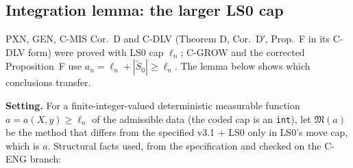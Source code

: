 \subsection{Integration lemma: the larger LS0 cap}\label{sec:cap}
PXN, GEN, C-MIS Cor.~D and C-DLV (Theorem D, Cor.~D′, Prop.~F in its C-DLV form) were proved with LS0 cap $\ell_n$; C-GROW and the corrected Proposition~F use $a_n=\ell_n+|\tilde{S}_0|\ge\ell_n$. The lemma below shows which conclusions transfer.

\textbf{Setting.} For a finite-integer-valued deterministic measurable function $a=a(X,y)\ge\ell_n$ of the admissible data (the coded cap is an \texttt{int}), let $\mathfrak M(a)$ be the method that differs from the specified v3.1 + LS0 only in LS0's move cap, which is $a$. Structural facts used, from the specification and checked on the C-ENG branch:
